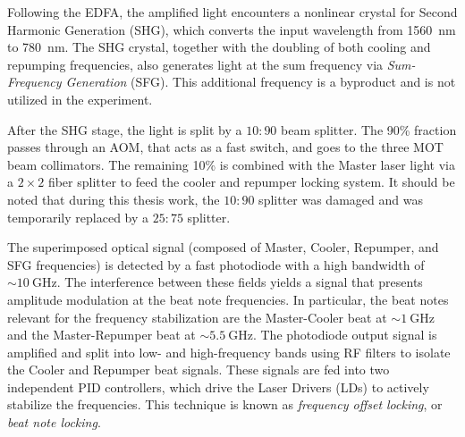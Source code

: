 Following the EDFA, the amplified light encounters a nonlinear crystal for Second Harmonic Generation (SHG), which converts the input wavelength from 1560~nm to 780~nm. The SHG crystal, together with the doubling of both cooling and repumping frequencies, also generates light at the sum frequency via \textit{Sum-Frequency Generation} (SFG). This additional frequency is a byproduct and is not utilized in the experiment.

After the SHG stage, the light is split by a $10:90$ beam splitter. The 90\% fraction passes through an AOM, that acts as a fast switch, and goes to the three MOT beam collimators. The remaining 10\% is combined with the Master laser light via a $2\times 2$ fiber splitter to feed the cooler and repumper locking system. It should be noted that during this thesis work, the $10:90$ splitter was damaged and was temporarily replaced by a $25:75$ splitter.

The superimposed optical signal (composed of Master, Cooler, Repumper, and SFG frequencies) is detected by a fast photodiode with a high bandwidth of $\sim 10~\text{GHz}$. The interference between these fields yields a signal that presents amplitude modulation at the beat note frequencies. In particular, the beat notes relevant for the frequency stabilization are the Master-Cooler beat at $\sim 1~\text{GHz}$ and the Master-Repumper beat at $\sim 5.5~\text{GHz}$.
The photodiode output signal is amplified and split into low- and high-frequency bands using RF filters to isolate the Cooler and Repumper beat signals. These signals are fed into two independent PID controllers, which drive the Laser Drivers (LDs) to actively stabilize the frequencies. This technique is known as \textit{frequency offset locking}, or \textit{beat note locking}.